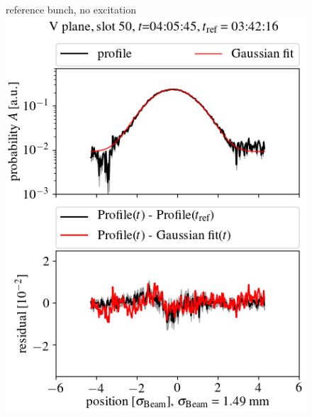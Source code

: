\documentclass[%
 reprint,
 amsmath,amssymb,
 aps,
prstab,
]{revtex4-1}
\begin{document}
\begin{figure}[h]
	\begin{minipage}[t]{0.49\linewidth}
		\centering
		reference bunch, no excitation
		\includegraphics[width=1.0\linewidth]{profile_v10th_slot_50.png}
	\end{minipage}
	\begin{minipage}[t]{0.49\linewidth}
		\centering

\end{minipage}
\end{figure}
\end{document}
